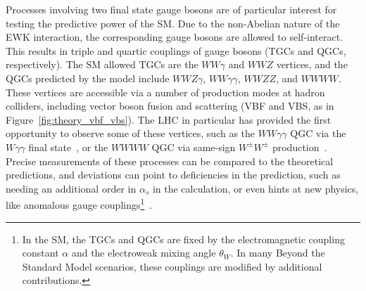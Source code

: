 Processes involving two final state gauge bosons are of particular interest for testing the predictive power of the SM.
Due to the non-Abelian nature of the EWK interaction, the corresponding gauge bosons are allowed to self-interact.
This results in triple and quartic couplings of gauge bosons (TGCs and QGCs, respectively).
The SM allowed TGCs are the $WW\gamma$ and $WWZ$ vertices, and the QGCs predicted by the model include $WWZ\gamma$, $WW\gamma\gamma$, $WWZZ$, and $WWWW$.
These vertices are accessible via a number of production modes at hadron colliders, including vector boson fusion and scattering (VBF and VBS, as in Figure~\ref{fig:theory_vbf_vbs}).
The LHC in particular has provided the first opportunity to observe some of these vertices, such as the $WW\gamma\gamma$ QGC via the $W\gamma\gamma$ final state~\cite{2015.wgg}, or the $WWWW$ QGC via same-sign $W^{\pm}W^{\pm}$ production~\cite{2014.ssww-8tev-atlas}.
Precise measurements of these processes can be compared to the theoretical predictions, and deviations can point to deficiencies in the prediction, such as needing an additional order in $\alpha_s$ in the calculation, or even hints at new physics, like anomalous gauge couplings\footnote{In the SM, the TGCs and QGCs are fixed by the electromagnetic coupling constant $\alpha$ and the electroweak mixing angle $\theta_W$.  In many Beyond the Standard Model scenarios, these couplings are modified by additional contributions.}~\cite{2017.anomalous-tgc-lhc}.

